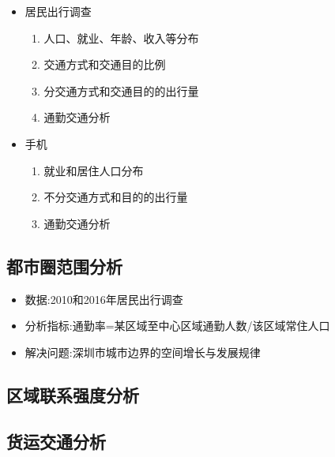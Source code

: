 \begin{frame}[t]{\subsecname}
  \begin{itemize}
     \item<1-> 居民出行调查
        \begin{enumerate}
          \item 人口、就业、年龄、收入等分布
          \item 交通方式和交通目的比例
          \item 分交通方式和交通目的的出行量
          \item 通勤交通分析 
        \end{enumerate}
  \end{itemize}
  \begin{itemize}
     \item<2-> 手机
        \begin{enumerate}
          \item 就业和居住人口分布
          \item 不分交通方式和目的的出行量
          \item 通勤交通分析 
        \end{enumerate}
  \end{itemize}

\end{frame}

\subsection{都市圈范围分析}

\begin{frame}[t]{\subsecname}
\begin{itemize}
  \item<1-> 数据:2010和2016年居民出行调查
  \item<2-> 分析指标:通勤率=某区域至中心区域通勤人数/该区域常住人口
  \item<3-> 解决问题:深圳市城市边界的空间增长与发展规律
\end{itemize}

\end{frame}

\subsection{区域联系强度分析}

\subsection{货运交通分析}


